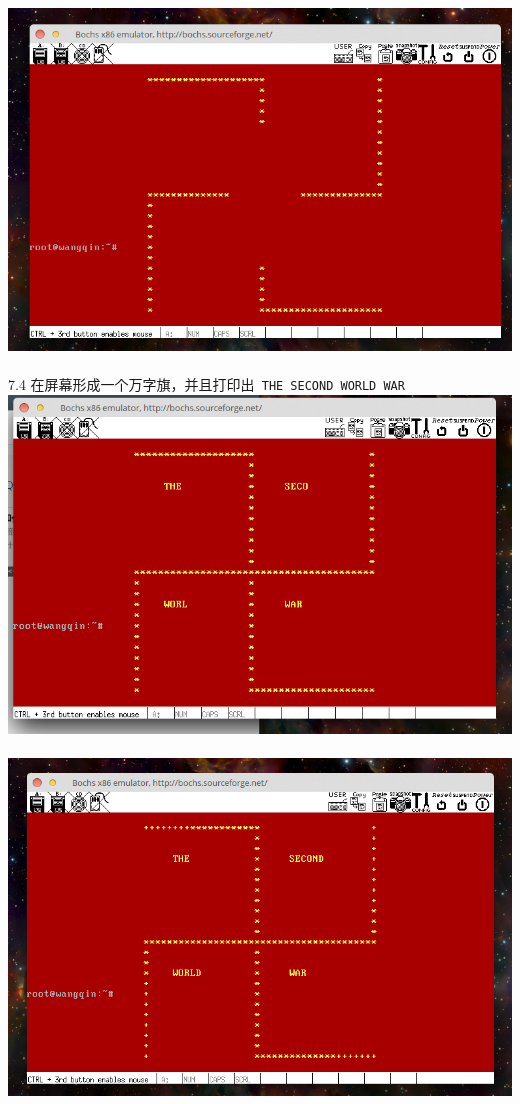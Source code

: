 \documentclass[a4paper]{article}
\begin{document}
{{{\center\includegraphics[scale=0.45]{Illustrations/process_start2.png}}\\\\
7.4 在屏幕形成一个万字旗，并且打印出\verb| THE SECOND WORLD WAR| 
{\center\includegraphics[scale=0.45]{Illustrations/process_start3.png}}\\\\
{\center\includegraphics[scale=0.45]{Illustrations/process_start5.png}}\\\\
}}
\end{document}

